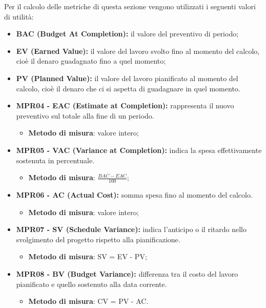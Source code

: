 Per il calcolo delle metriche di questa sezione vengono utilizzati i seguenti valori di utilità:
\begin{itemize}
    \item \textbf{BAC (Budget At Completion):} il valore del preventivo di periodo;
    \item \textbf{EV (Earned Value):}  il valore del lavoro svolto fino al momento del calcolo, cioè il denaro guadagnato fino a quel momento;
    \item \textbf{PV (Planned Value):} il valore del lavoro pianificato al momento del calcolo, cioè il denaro che ci si aspetta di guadagnare in quel momento.
\end{itemize}
\begin{itemize}
    \item \textbf{MPR04 - EAC (Estimate at Completion):} rappresenta il nuovo preventivo sul totale alla fine di un periodo.
          \begin{itemize}
              \item
                    \textbf{Metodo di misura}: valore intero;
          \end{itemize}
    \item \textbf{MPR05 - VAC (Variance at Completion):} indica la spesa effettivamente sostenuta in percentuale.
          \begin{itemize}
              \item \textbf{Metodo di misura}: $\frac{BAC - EAC}{100}$;
          \end{itemize}
    \item \textbf{MPR06 - AC (Actual Cost):} somma spesa fino al momento del calcolo.
          \begin{itemize}
              \item
                    \textbf{Metodo di misura}: valore intero;
          \end{itemize}
    \item \textbf{MPR07 - SV (Schedule Variance):} indica l'anticipo o il ritardo nello svolgimento del progetto rispetto alla pianificazione.\begin{itemize}
              \item
                    \textbf{Metodo di misura}: SV = EV - PV;
          \end{itemize}
    \item \textbf{MPR08 - BV (Budget Variance):} differenza tra il costo del lavoro pianificato e quello sostenuto alla data corrente.\begin{itemize}
              \item
                    \textbf{Metodo di misura}: CV = PV - AC.
          \end{itemize}
\end{itemize}
